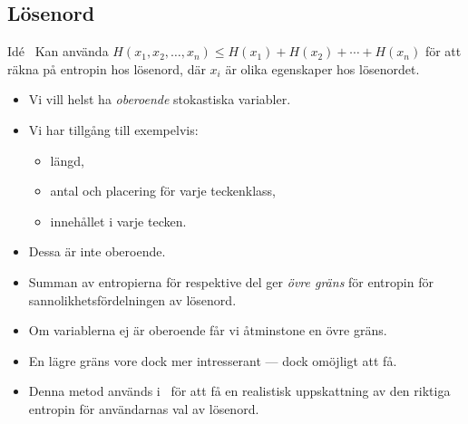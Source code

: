 \documentclass{beamer}
\begin{document}
\subsection{Lösenord}

\begin{frame}
  \begin{block}{Idé~\cite{Komanduri2011opa}}
    Kan använda \(H(x_1, x_2, \ldots, x_n) \leq H(x_1) + H(x_2) + \cdots 
      + H(x_n)\) för att räkna på entropin hos lösenord, där \(x_i\) är olika 
    egenskaper hos lösenordet.
  \end{block}

  \begin{example}
    \begin{itemize}
      \item Vi vill helst ha \emph{oberoende} stokastiska variabler.

      \item Vi har tillgång till exempelvis:
        \begin{itemize}
          \item längd,
          \item antal och placering för varje teckenklass,
          \item innehållet i varje tecken.
        \end{itemize}

      \item Dessa är inte oberoende.

      \item Summan av entropierna för respektive del ger \emph{övre gräns} för 
        entropin för sannolikhetsfördelningen av lösenord.

    \end{itemize}
  \end{example}
\end{frame}

\begin{frame}
  \begin{remark}
    \begin{itemize}
      \item Om variablerna ej är oberoende får vi åtminstone en övre gräns.

      \item En lägre gräns vore dock mer intresserant --- dock omöjligt att få.

      \item Denna metod används i~\cite{Komanduri2011opa} för att få en 
        realistisk uppskattning av den riktiga entropin för användarnas val av 
        lösenord.

    \end{itemize}
  \end{remark}
\end{frame}
\end{document}
